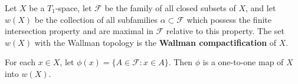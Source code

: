 Let $X$ be a $T_1$-space, let $\mathcal{F}$ be the family of all closed subsets of $X$, and let $w(X)$ be the collection of all subfamilies $\alpha \subset \mathcal{F}$ which possess the finite intersection property and are maximal in $\mathcal{F}$ relative to this property. The set $w(X)$ with the Wallman topology is the \textbf{Wallman compactification} of $X$.

For each $x \in X$, let $\phi(x) = \{A \in \mathcal{F} : x \in A\}$. Then $\phi$ is a one-to-one map of $X$ into $w(X)$.
